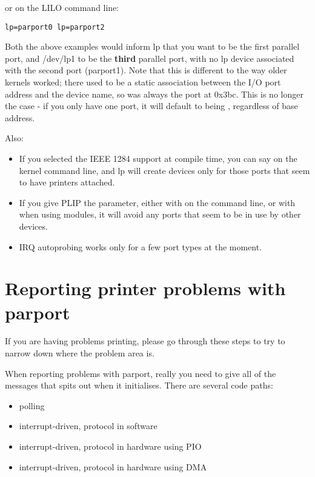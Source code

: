 \documentclass[a4paper,8pt,english]{sphinxmanual}
\begin{document}
or on the LILO command line:

\begin{Verbatim}[commandchars=\\\{\}]
lp=parport0 lp=parport2
\end{Verbatim}

Both the above examples would inform lp that you want  to be
the first parallel port, and /dev/lp1 to be the \textbf{third} parallel port,
with no lp device associated with the second port (parport1).  Note
that this is different to the way older kernels worked; there used to
be a static association between the I/O port address and the device
name, so  was always the port at 0x3bc.  This is no longer the
case - if you only have one port, it will default to being ,
regardless of base address.

Also:
\begin{itemize}
\item {} 
If you selected the IEEE 1284 support at compile time, you can say
 on the kernel command line, and lp will create devices
only for those ports that seem to have printers attached.

\item {} 
If you give PLIP the  parameter, either with  on
the command line, or with  when using modules,
it will avoid any ports that seem to be in use by other devices.

\item {} 
IRQ autoprobing works only for a few port types at the moment.

\end{itemize}


\section{Reporting printer problems with parport}
\label{admin-guide/parport:reporting-printer-problems-with-parport}
If you are having problems printing, please go through these steps to
try to narrow down where the problem area is.

When reporting problems with parport, really you need to give all of
the messages that  spits out when it initialises.  There are
several code paths:
\begin{itemize}
\item {} 
polling

\item {} 
interrupt-driven, protocol in software

\item {} 
interrupt-driven, protocol in hardware using PIO

\item {} 
interrupt-driven, protocol in hardware using DMA

\end{itemize}
\end{document}

